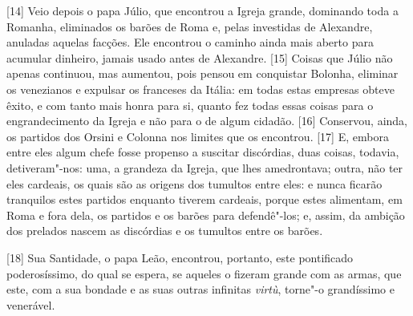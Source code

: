 {[}14{]} Veio depois o papa Júlio, que encontrou a Igreja grande,
dominando toda a Romanha, eliminados os barões de Roma e, pelas
investidas de Alexandre, anuladas aquelas facções. Ele encontrou o
caminho ainda mais aberto para acumular dinheiro, jamais usado antes de
Alexandre. {[}15{]} Coisas que Júlio não apenas continuou, mas aumentou,
pois pensou em conquistar Bolonha, eliminar os venezianos e expulsar os
franceses da Itália: em todas estas empresas obteve êxito, e com tanto
mais honra para si, quanto fez todas essas coisas para o engrandecimento
da Igreja e não para o de algum cidadão. {[}16{]} Conservou, ainda, os
partidos dos Orsini e Colonna nos limites que os encontrou. {[}17{]} E,
embora entre eles algum chefe fosse propenso a suscitar discórdias, duas
coisas, todavia, detiveram"-nos: uma, a grandeza da Igreja, que lhes
amedrontava; outra, não ter eles cardeais, os quais são as origens dos
tumultos entre eles: e nunca ficarão tranquilos estes partidos enquanto
tiverem cardeais, porque estes alimentam, em Roma e fora dela, os partidos e os barões para
defendê"-los; e, assim, da ambição dos prelados nascem as discórdias e os
tumultos entre os barões.

{[}18{]} Sua Santidade, o papa Leão, encontrou,
portanto, este pontificado poderosíssimo, do qual se espera, se aqueles
o fizeram grande com as armas, que este, com a sua bondade e as suas
outras infinitas \emph{virtù}, torne"-o grandíssimo e venerável.


